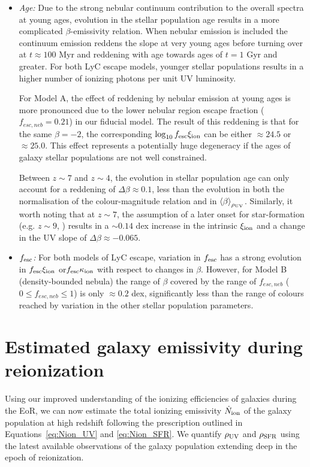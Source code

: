 \begin{itemize}
    \item \emph{Age:} Due to the strong nebular continuum contribution to the overall spectra at young ages, evolution in the stellar population age results in a more complicated $\beta$-emissivity relation. When nebular emission is included the continuum emission reddens the slope at very young ages before turning over at $t\approx100$ Myr and reddening with age towards ages of $t = 1$ Gyr and greater. For both LyC escape models, younger stellar populations results in a higher number of ionizing photons per unit UV luminosity. 

    For Model A, the effect of reddening by nebular emission at young ages is more pronounced due to the lower nebular region escape fraction ($f_{esc,neb} = 0.21$) in our fiducial model. The result of this reddening is that for the same $\beta = -2$, the corresponding $\log_{10} f_{\rm{esc}}\xi_{\rm{ion}}$ can be either $\approx 24.5$ or $\approx 25.0$. This effect represents a potentially huge degeneracy if the ages of galaxy stellar populations are not well constrained.
    
    Between $z\sim 7$ and $z\sim4$, the evolution in stellar population age can only account for a reddening of $\Delta\beta \approx 0.1$, less than the evolution in both the normalisation of the colour-magnitude relation and in $\left \langle \beta  \right \rangle_{\rho_{\rm{UV}}}$. Similarly, it worth noting that at $z\sim7$, the assumption of a later onset for star-formation (e.g. $z\sim 9$, \citet{2015arXiv150201589P}) results in a $\sim0.14$ dex increase in the intrinsic $\xi_{\rm{ion}}$ and a change in the UV slope of $\Delta\beta \approx -0.065$. 
    
    \item \emph{$f_{\rm{esc}}$:} For both models of LyC escape, variation in $f_{\rm{esc}}$ has a strong evolution in $f_{\rm{esc}}\xi_{\rm{ion}}$ or$f_{\rm{esc}}\kappa_{\rm{ion}}$ with respect to changes in $\beta$. However, for Model B (density-bounded nebula) the range of $\beta$ covered by the range of $f_{esc,neb}$ ($0 \leq f_{esc,neb} \leq 1$) is only $\approx 0.2$ dex, significantly less than the range of colours reached by variation in the other stellar population parameters.
\end{itemize}


\section{Estimated galaxy emissivity during reionization}\label{reion-sec:results}
Using our improved understanding of the ionizing efficiencies of galaxies during the EoR, we can now estimate the total ionizing emissivity $\dot{N}_{\rm{ion}}$ of the galaxy population at high redshift following the prescription outlined in Equations~\ref{eq:Nion_UV} and \ref{eq:Nion_SFR}. We quantify $\rho_{\rm{UV}}$ and $\rho_{\rm{SFR}}$ using the latest available observations of the galaxy population extending deep in the epoch of reionization.

